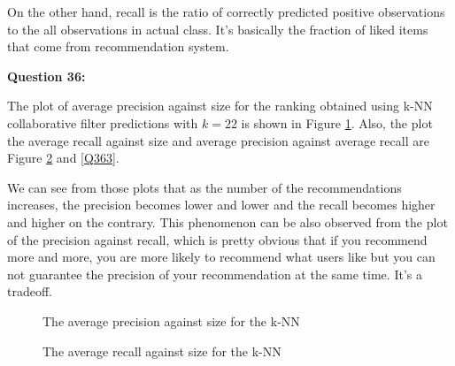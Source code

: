 \documentclass{article}
\begin{document}
On the other hand,  recall is the ratio of correctly predicted positive observations to the all observations in actual class. It's basically the fraction of liked items that come from recommendation system.

\bigbreak \textbf{Question 36:}

The plot of average precision against size for the ranking obtained using k-NN collaborative filter predictions with $k = 22$ is shown in Figure \ref{Q361}. Also, the plot the average recall against size and average precision against average recall are Figure \ref{Q362} and \ref{Q363}.

We can see from those plots that as the number of the recommendations increases, the precision becomes lower and lower and the recall becomes higher and higher on the contrary. This phenomenon can be also observed from the plot of the precision against recall, which is pretty obvious that if you recommend more and more, you are more likely to recommend what users like but you can not guarantee the precision of your recommendation at the same time. It's a tradeoff.

\begin{figure}
\centering
{}
\caption{The average precision against size for the k-NN} 
\label{Q361}
\end{figure}

\begin{figure}
\centering
{}
\caption{The average recall against size for the k-NN} 
\label{Q362}
\end{figure}
\end{document}
